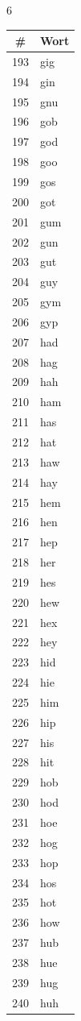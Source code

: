\documentclass[11pt,a4paper]{article}
\begin{document}
\begin{multicols}{6}
\columnbreak

\begin{tabular}{cl}
\toprule
\# & Wort \\
\midrule
193 & gig \\
194 & gin \\
195 & gnu \\
196 & gob \\
197 & god \\
198 & goo \\
199 & gos \\
200 & got \\
201 & gum \\
202 & gun \\
203 & gut \\
204 & guy \\
205 & gym \\
206 & gyp \\
207 & had \\
208 & hag \\
209 & hah \\
210 & ham \\
211 & has \\
212 & hat \\
213 & haw \\
214 & hay \\
215 & hem \\
216 & hen \\
217 & hep \\
218 & her \\
219 & hes \\
220 & hew \\
221 & hex \\
222 & hey \\
223 & hid \\
224 & hie \\
225 & him \\
226 & hip \\
227 & his \\
228 & hit \\
229 & hob \\
230 & hod \\
231 & hoe \\
232 & hog \\
233 & hop \\
234 & hos \\
235 & hot \\
236 & how \\
237 & hub \\
238 & hue \\
239 & hug \\
240 & huh \\
\bottomrule
\end{tabular}


\end{multicols}
\end{document}
